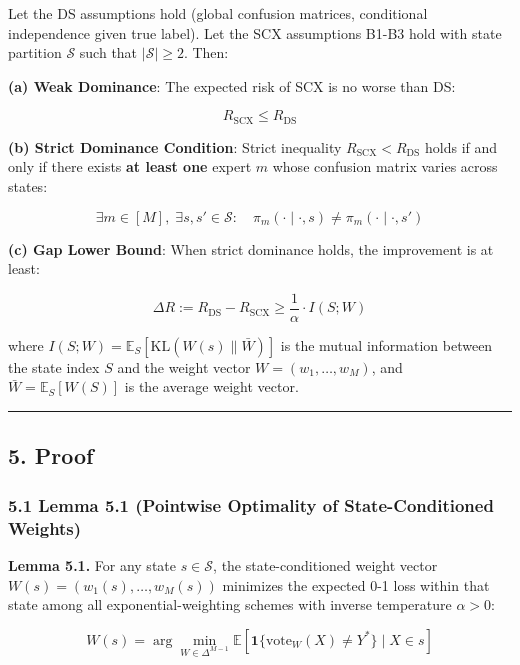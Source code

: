 \documentclass[
  12pt,
]{ctexart}
\begin{document}
Let the DS assumptions hold (global confusion matrices, conditional
independence given true label). Let the SCX assumptions B1-B3 hold with
state partition \(\mathcal{S}\) such that \(|\mathcal{S}| \geq 2\).
Then:

\textbf{(a) Weak Dominance}: The expected risk of SCX is no worse than
DS:

\[R_{\text{SCX}} \leq R_{\text{DS}}\]

\textbf{(b) Strict Dominance Condition}: Strict inequality
\(R_{\text{SCX}} < R_{\text{DS}}\) holds if and only if there exists
\textbf{at least one} expert \(m\) whose confusion matrix varies across
states:

\[\exists m \in [M], \; \exists s, s' \in \mathcal{S}: \quad \pi_m(\cdot \mid \cdot, s) \neq \pi_m(\cdot \mid \cdot, s')\]

\textbf{(c) Gap Lower Bound}: When strict dominance holds, the
improvement is at least:

\[\Delta R := R_{\text{DS}} - R_{\text{SCX}} \geq \frac{1}{\alpha} \cdot I(S; W)\]

where \(I(S; W) = \mathbb{E}_{S}[\text{KL}(W(s) \parallel \bar{W})]\) is
the mutual information between the state index \(S\) and the weight
vector \(W = (w_1, \dots, w_M)\), and \(\bar{W} = \mathbb{E}_S[W(S)]\)
is the average weight vector.

\begin{center}\rule{0.5\linewidth}{0.5pt}\end{center}

\subsection{5. Proof}\label{proof}

\subsubsection{5.1 Lemma 5.1 (Pointwise Optimality of State-Conditioned
Weights)}\label{lemma-5.1-pointwise-optimality-of-state-conditioned-weights}

\textbf{Lemma 5.1.} For any state \(s \in \mathcal{S}\), the
state-conditioned weight vector \(W(s) = (w_1(s), \dots, w_M(s))\)
minimizes the expected 0-1 loss within that state among all
exponential-weighting schemes with inverse temperature \(\alpha > 0\):

\[W(s) = \arg\min_{W \in \Delta^{M-1}} \mathbb{E}\left[ \mathbf{1}\{\text{vote}_W(X) \neq Y^*\} \;\Big|\; X \in s \right]\]
\end{document}
